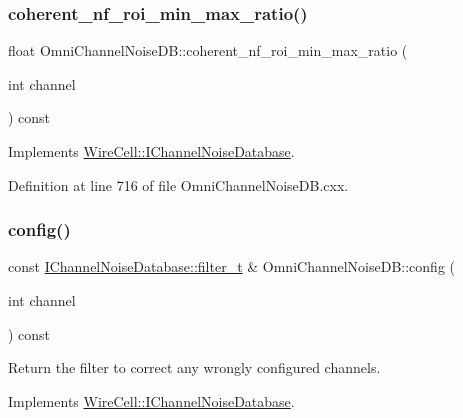 \subsubsection{\texorpdfstring{coherent\+\_\+nf\+\_\+roi\+\_\+min\+\_\+max\+\_\+ratio()}{coherent\_nf\_roi\_min\_max\_ratio()}}
{\footnotesize\ttfamily float Omni\+Channel\+Noise\+D\+B\+::coherent\+\_\+nf\+\_\+roi\+\_\+min\+\_\+max\+\_\+ratio (\begin{DoxyParamCaption}\item[{int}]{channel }\end{DoxyParamCaption}) const\hspace{0.3cm}{\ttfamily [virtual]}}



Implements \hyperlink{class_wire_cell_1_1_i_channel_noise_database_a3fab0404aa8a10ad7ed2ac7afd2fe9a7}{Wire\+Cell\+::\+I\+Channel\+Noise\+Database}.



Definition at line 716 of file Omni\+Channel\+Noise\+D\+B.\+cxx.

\mbox{\label{class_wire_cell_1_1_sig_proc_1_1_omni_channel_noise_d_b_acc904d0a6472acede55bd40ef8b6cd01}} 
\subsubsection{\texorpdfstring{config()}{config()}}
{\footnotesize\ttfamily const \hyperlink{class_wire_cell_1_1_i_channel_noise_database_a0acbae29743542eb1c652f7a56e692f5}{I\+Channel\+Noise\+Database\+::filter\+\_\+t} \& Omni\+Channel\+Noise\+D\+B\+::config (\begin{DoxyParamCaption}\item[{int}]{channel }\end{DoxyParamCaption}) const\hspace{0.3cm}{\ttfamily [virtual]}}



Return the filter to correct any wrongly configured channels. 



Implements \hyperlink{class_wire_cell_1_1_i_channel_noise_database_af6887aa00ed134c7fcb1ee85bd950311}{Wire\+Cell\+::\+I\+Channel\+Noise\+Database}.



